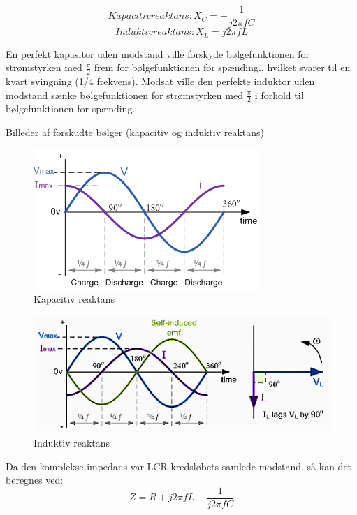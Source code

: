 \begin{equation} 
Kapacitiv reaktans: X_C = - \frac{1}{j 2 \pi f C}
\end{equation}
\begin{equation}
Induktiv reaktans: X_L = j 2 \pi f L
\end{equation}

En perfekt kapasitor uden modstand ville forskyde bølgefunktionen for strømstyrken med $\frac{\pi}{2}$ frem for bølgefunktionen for spænding., hvilket svarer til en kvart svingning (1/4 frekvens). Modsat ville den perfekte induktor uden modstand sænke bølgefunktionen for strømstyrken med $\frac{\pi}{2}$ i forhold til bølgefunktionen for spænding.

Billeder af forskudte bølger (kapacitiv og induktiv reaktans)
\begin{figure}[H]
\centering
\includegraphics[scale=1.25]{Vildledning/Schematics/Kapacitiv_reaktans}
\caption{Kapacitiv reaktans \cite{kapasitans}}
\label{kreaktans}
\end{figure}

\begin{figure}[H]
\centering
\includegraphics[scale=1.10]{Vildledning/Schematics/Induktiv_reaktans}
\caption{Induktiv reaktans \cite{kapasitans}}
\label{ireaktans}
\end{figure}

Da den komplekse impedans var LCR-kredsløbets samlede modstand, så kan det beregnes ved: \cite{impedans}
\begin{equation}
Z = R + j 2 \pi f L - \frac{1}{j 2 \pi f C}
\end{equation}
\newpage